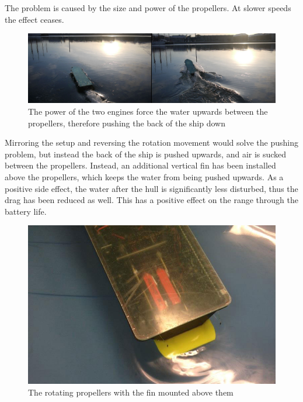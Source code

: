 The problem is caused by the size and power of the propellers. At slower speeds the effect ceases.

\begin{figure}[waterpushup]
	\centering
	\includegraphics[width=\textwidth]{Pictures/Forward.jpg}
	\caption{The power of the two engines force the water upwards between the propellers, therefore pushing the back of the ship down}
	\label{fig:vessel-block-overview}
\end{figure}

Mirroring the setup and reversing the rotation movement would solve the pushing problem, but instead the back of the ship is pushed upwards, and air is sucked between the propellers. Instead, an additional vertical fin has been installed above the propellers, which keeps the water from being pushed upwards. As a positive side effect, the water after the hull is significantly less disturbed, thus the drag has been reduced as well. This has a positive effect on the range through the battery life.

\begin{figure}[fin]
	\centering
	\includegraphics[width=\textwidth]{Pictures/Fin.jpg}
	\caption{The rotating propellers with the fin mounted above them}
	\label{fig:vessel-block-overview}
\end{figure}